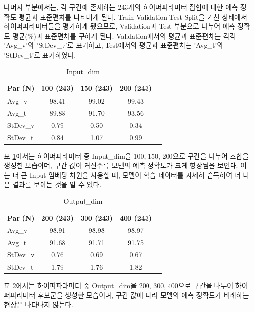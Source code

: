 \documentclass{kcc}
\begin{document}
나머지 부분에서는, 각 구간에 존재하는 243개의 하이퍼파라미터 집합에 대한 예측 정확도 평균과 표준편차를 나타내게 된다. Train-Validation-Test Split을 거친 상태에서 하이퍼파라미터들을 평가하게 됐으므로, Validation과 Test 부분으로 나누어 예측 정확도 평균(\%)과 표준편차를 구하게 된다. Validation에서의 평균과 표준편차는 각각 'Avg\_v'와 'StDev\_v'로 표기하고, Test에서의 평균과 표준편차는 'Avg\_t'와 'StDev\_t'로 표기하였다.

\begin{table}[!ht]
\centering
\setlength{\belowcaptionskip}{5pt}
\caption{Input\_dim}
\label{tab:Input_dim}
\begin{tabular}{@{}lcccc@{}} 
\toprule
{\bfseries Par (N)} & 100 (243) & 150 (243) & 200 (243) \\
\midrule
Avg\_v  & 98.41 & 99.02 & 99.43 \\
Avg\_t  & 89.88 & 91.70 & 93.56 \\
StDev\_v & 0.79 & 0.50 & 0.34 \\
StDev\_t & 0.84 & 1.07 & 0.99 \\
\bottomrule
\end{tabular}
\end{table}

표 \ref{tab:Input_dim}에서는 하이퍼파라미터 중 Input\_dim을 100, 150, 200으로 구간을 나누어 조합을 생성한 모습이며, 구간 값이 커질수록 모델의 예측 정확도가 크게 향상됨을 보인다. 이는 더 큰 Input 임베딩 차원을 사용할 때, 모델이 학습 데이터를 자세히 습득하여 더 나은 결과를 보이는 것을 알 수 있다.

\begin{table}[!ht]
\centering
\setlength{\belowcaptionskip}{5pt}
\caption{Output\_dim}
\label{tab:Output_dim}
\begin{tabular}{@{}lcccc@{}} 
\toprule
{\bfseries Par (N)} & 200 (243) & 300 (243) & 400 (243) \\
\midrule
Avg\_v  & 98.91 & 98.98 & 98.97 \\
Avg\_t  & 91.68 & 91.71 & 91.75 \\
StDev\_v & 0.76 & 0.69 & 0.67 \\
StDev\_t & 1.79 & 1.76 & 1.82 \\
\bottomrule
\end{tabular}
\end{table}


표 \ref{tab:Output_dim}에서는 하이퍼파라미터 중 Output\_dim을 200, 300, 400으로 구간을 나누어 하이퍼파라미터 후보군을 생성한 모습이며, 구간 값에 따라 모델의 예측 정확도가 비례하는 현상은 나타나지 않는다.
\end{document}

